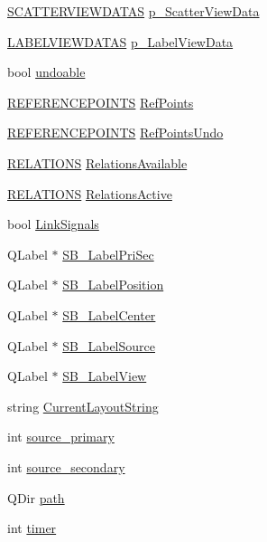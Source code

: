\begin{CompactItemize}
\hyperlink{data_8h_a953c53274e98dacd22a04f1ea780f9a}{SCATTERVIEWDATAS} \hyperlink{class_main_window_61a2ce18a16fee4209001825b545ee2a}{p\_\-ScatterViewData}
\item 
\hyperlink{data_8h_bd710be392f835c57dbf67d4a36032ae}{LABELVIEWDATAS} \hyperlink{class_main_window_b66da5681a989a013d707fd70813f96c}{p\_\-LabelViewData}
\item 
bool \hyperlink{class_main_window_03c636eafc93ddb5e75d5fd1350cb939}{undoable}
\item 
\hyperlink{data_8h_7b296bba56ab2e0ad6167aadcafe80d2}{REFERENCEPOINTS} \hyperlink{class_main_window_3f68fc9df9c42bfa5d42e34d9f500d73}{RefPoints}
\item 
\hyperlink{data_8h_7b296bba56ab2e0ad6167aadcafe80d2}{REFERENCEPOINTS} \hyperlink{class_main_window_b176b57f0a1eb0fbd3bb3c05adc183da}{RefPointsUndo}
\item 
\hyperlink{data_8h_4b97445fb0d920ec53954c1420f3217c}{RELATIONS} \hyperlink{class_main_window_eed71a1f58ba6007bad7aa41e4cd7db1}{RelationsAvailable}
\item 
\hyperlink{data_8h_4b97445fb0d920ec53954c1420f3217c}{RELATIONS} \hyperlink{class_main_window_267532048848d3ec6ae4b4e439ef3599}{RelationsActive}
\item 
bool \hyperlink{class_main_window_86bfde515da7e7388605ef52723bf363}{LinkSignals}
\item 
QLabel $\ast$ \hyperlink{class_main_window_5e5403ea63c6310c974a4456f0542f1f}{SB\_\-LabelPriSec}
\item 
QLabel $\ast$ \hyperlink{class_main_window_ba28f8de5373327ff9b5aa85cf443994}{SB\_\-LabelPosition}
\item 
QLabel $\ast$ \hyperlink{class_main_window_3aedcafdd0ee16b6ec5d3da8d80e2f53}{SB\_\-LabelCenter}
\item 
QLabel $\ast$ \hyperlink{class_main_window_26661d9f5672bd4b5b27b9a9b3aa2ff3}{SB\_\-LabelSource}
\item 
QLabel $\ast$ \hyperlink{class_main_window_ef28f019ed8b77976e523d0a100eb0fe}{SB\_\-LabelView}
\item 
string \hyperlink{class_main_window_824d79e48c7054d60d83bae54eedb52a}{CurrentLayoutString}
\item 
int \hyperlink{class_main_window_7722e59bb7dd1aeb2a261a71c9fa7f34}{source\_\-primary}
\item 
int \hyperlink{class_main_window_e96113427e0b380c65ff42c7d9f0f893}{source\_\-secondary}
\item 
QDir \hyperlink{class_main_window_66a2cc7b362f267bb03c7cb50148068c}{path}
\item 
int \hyperlink{class_main_window_b4f483f5c695321518ac4bf1aa136f64}{timer}
\end{CompactItemize}


